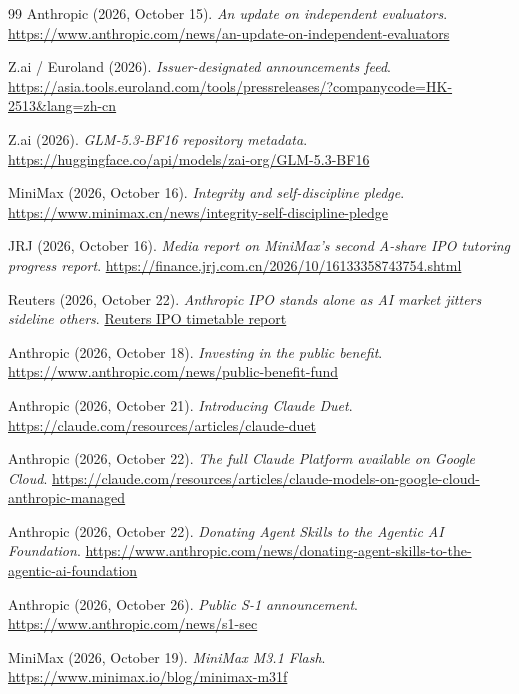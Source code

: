 \documentclass[11pt]{article}
\begin{document}
\begin{thebibliography}{99}
Anthropic (2026, October 15). \emph{An update on independent evaluators}.
\url{https://www.anthropic.com/news/an-update-on-independent-evaluators}

Z.ai / Euroland (2026). \emph{Issuer-designated announcements feed}.
\url{https://asia.tools.euroland.com/tools/pressreleases/?companycode=HK-2513&lang=zh-cn}

Z.ai (2026). \emph{GLM-5.3-BF16 repository metadata}.
\url{https://huggingface.co/api/models/zai-org/GLM-5.3-BF16}

MiniMax (2026, October 16). \emph{Integrity and self-discipline pledge}.
\url{https://www.minimax.cn/news/integrity-self-discipline-pledge}

JRJ (2026, October 16). \emph{Media report on MiniMax's second A-share IPO tutoring progress report}.
\url{https://finance.jrj.com.cn/2026/10/16133358743754.shtml}

Reuters (2026, October 22). \emph{Anthropic IPO stands alone as AI market jitters sideline others}.
\href{https://uk.marketscreener.com/news/anthropic-ipo-stands-alone-as-ai-market-jitters-sideline-others-ce785cdeda8cf026}{Reuters IPO timetable report}

Anthropic (2026, October 18). \emph{Investing in the public benefit}.
\url{https://www.anthropic.com/news/public-benefit-fund}

Anthropic (2026, October 21). \emph{Introducing Claude Duet}.
\url{https://claude.com/resources/articles/claude-duet}

Anthropic (2026, October 22). \emph{The full Claude Platform available on Google Cloud}.
\url{https://claude.com/resources/articles/claude-models-on-google-cloud-anthropic-managed}

Anthropic (2026, October 22). \emph{Donating Agent Skills to the Agentic AI Foundation}.
\url{https://www.anthropic.com/news/donating-agent-skills-to-the-agentic-ai-foundation}

Anthropic (2026, October 26). \emph{Public S-1 announcement}.
\url{https://www.anthropic.com/news/s1-sec}

MiniMax (2026, October 19). \emph{MiniMax M3.1 Flash}.
\url{https://www.minimax.io/blog/minimax-m31f}


\end{thebibliography}
\end{document}
